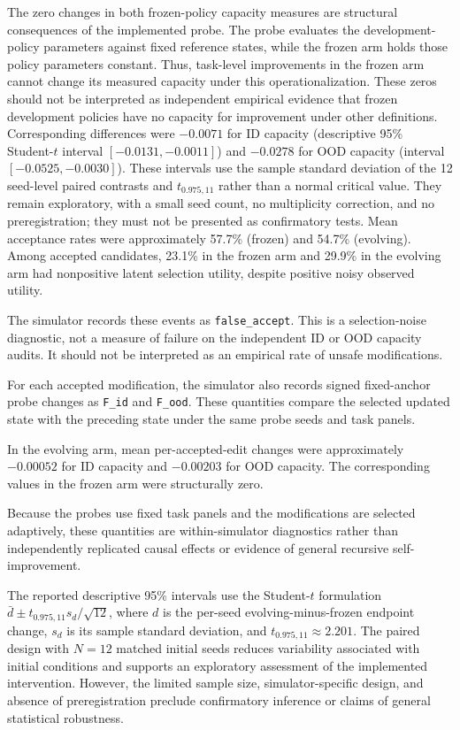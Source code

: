 \documentclass[11pt,a4paper]{article}
\begin{document}
The zero changes in both frozen-policy capacity measures are structural consequences of the implemented probe. The probe evaluates the development-policy parameters against fixed reference states, while the frozen arm holds those policy parameters constant. Thus, task-level improvements in the frozen arm cannot change its measured capacity under this operationalization. These zeros should not be interpreted as independent empirical evidence that frozen development policies have no capacity for improvement under other definitions. Corresponding differences were $-0.0071$ for
ID capacity (descriptive 95\% Student-$t$ interval $[-0.0131,-0.0011]$) and $-0.0278$
for OOD capacity (interval $[-0.0525,-0.0030]$). These intervals use the sample standard deviation of the 12 seed-level paired contrasts and $t_{0.975,11}$ rather than a normal critical value. They remain exploratory, with a small seed count, no multiplicity correction, and no preregistration; they must not be presented as confirmatory tests. Mean acceptance rates were approximately 57.7\% (frozen) and 54.7\% (evolving). Among accepted candidates, 23.1\% in the frozen arm and 29.9\% in the evolving arm had nonpositive latent selection utility, despite positive noisy observed utility.

The simulator records these events as \texttt{false\_accept}. This is a selection-noise diagnostic, not a measure of failure on the independent ID or OOD capacity audits. It should not be interpreted as an empirical rate of unsafe modifications.

For each accepted modification, the simulator also records signed fixed-anchor probe changes
as \texttt{F\_id} and \texttt{F\_ood}. These quantities compare the selected updated state with the preceding state under the same probe seeds and task panels.

In the evolving arm, mean per-accepted-edit changes were approximately $-0.00052$ for ID capacity and $-0.00203$ for OOD capacity. The corresponding values in the frozen arm were structurally zero.

Because the probes use fixed task panels and the modifications are selected adaptively, these quantities are within-simulator diagnostics rather than independently replicated causal effects or evidence of general recursive self-improvement.

The reported descriptive 95\% intervals use the Student-$t$ formulation $\bar d \pm t_{0.975,11}s_d/\sqrt{12}$, where $d$ is the per-seed evolving-minus-frozen endpoint change, $s_d$ is its sample standard deviation, and $t_{0.975,11}\approx 2.201$. The paired design with \(N=12\) matched initial
seeds reduces variability associated with initial conditions and supports an exploratory assessment
of the implemented intervention. However, the limited sample size, simulator-specific design,
and absence of preregistration preclude confirmatory inference or claims of general statistical robustness.
\end{document}
